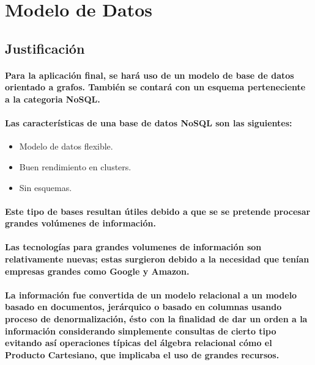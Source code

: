\clearpage
\section{Modelo de Datos}

\subsection{Justificación}
\paragraph{Para la aplicación final, se hará uso de un modelo de base de datos orientado a grafos. También se contará con un esquema perteneciente a la categoria NoSQL.}
\paragraph{ Las características de una base de datos NoSQL son las siguientes: }

\begin{itemize}
  \item Modelo de datos flexible.
  \item Buen rendimiento en clusters. 
  \item Sin esquemas.
\end{itemize}

\paragraph{Este tipo de bases resultan útiles debido a que se se pretende procesar grandes volúmenes de información.}

\paragraph{Las tecnologías para grandes volumenes de información son relativamente nuevas; estas surgieron debido a la necesidad que tenían empresas grandes como Google y Amazon.} 

\paragraph{La información fue convertida de un modelo relacional a un modelo basado en documentos, jerárquico o basado en columnas usando proceso de denormalización, ésto con la finalidad de dar un orden a la información considerando simplemente consultas de cierto tipo evitando así operaciones típicas del álgebra relacional cómo el Producto Cartesiano, que implicaba el uso de grandes recursos.}

